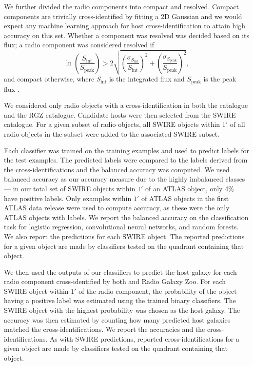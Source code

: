 \documentclass[fleqn,usenatbib,usedcolumn]{mnras}
\newcommand{\text}{\mathrm}
\begin{document}
    We further divided the radio components into compact and resolved. Compact
    components are trivially cross-identified by fitting a 2D Gaussian \citep[as
    in][]{norris06} and we would expect any machine learning approach for host
    cross-identification to attain high accuracy on this set. Whether a
    component was resolved was decided based on its flux; a radio component
    was considered resolved if
    \[
        \ln \left(
          \frac{S_{\text{int}}}
               {S_{\text{peak}}}
        \right) > 2\sqrt{\left(
          \frac{\sigma_{S_{\text{int}}}}
               {S_{\text{int}}}
        \right)^2 + \left(
          \frac{\sigma_{S_{\text{peak}}}}
               {S_{\text{peak}}}
        \right)^2},
    \] and compact otherwise, where \(S_{\text{int}}\) is the integrated
    flux and \(S_{\text{peak}}\) is the peak flux \citep{franzen15}.

    We considered only radio objects with a cross-identification in both the
    \citet{norris06} catalogue and the RGZ catalogue. Candidate hosts
    were then selected from the SWIRE catalogue. For a given subset of radio
    objects, all SWIRE objects within $1'$ of all radio objects in the
    subset were added to the associated SWIRE subset.

    Each classifier was trained on the training examples and used to predict
    labels for the test examples. The predicted labels were compared to the
    labels derived from the \citet{norris06} cross-identifications and the
    balanced accuracy was computed. We used balanced accuracy as our accuracy
    measure due to the highly imbalanced classes --- in our total set of SWIRE
    objects within $1'$ of an ATLAS object, only 4\% have positive labels.
    Only examples within $1'$ of ATLAS objects in the first ATLAS data release
    \citep{norris06} were used to compute accuracy, as these were the only
    ATLAS objects with \citet{norris06} labels. We report the balanced
    accuracy on the classification task for logistic regression, convolutional
    neural networks, and random forests. We also report the predictions for
    each SWIRE object. The reported predictions for a given object are made by
    classifiers tested on the quadrant containing that object.

    We then used the outputs of our classifiers to predict the host galaxy
    for each radio component cross-identified by both \citet{norris06}
    and Radio Galaxy Zoo. For each SWIRE object within $1'$ of the radio
    component, the probability of the object having a positive label was
    estimated using the trained binary classifiers. The SWIRE object with
    the highest probability was chosen as the host galaxy. The accuracy was
    then estimated by counting how many predicted host galaxies matched the
    \citet{norris06} cross-identifications. We report the accuracies and the
    cross-identifications. As with SWIRE predictions, reported
    cross-identifications for a given object are made by classifiers tested
    on the quadrant containing that object.
\end{document}
